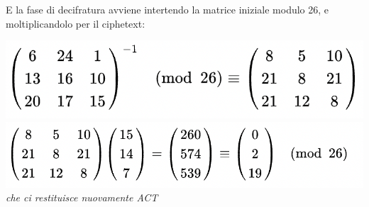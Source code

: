 \documentclass[11pt, oneside]{article}   	%
\begin{document}
E la fase di decifratura avviene intertendo la matrice iniziale modulo 26, e moltiplicandolo per il ciphetext:
\begin{center}
\includegraphics[scale=0.5]{4}\\
\includegraphics[scale=0.5]{5}\\
\emph{che ci restituisce nuovamente ACT}
\end{center}
\end{document}
